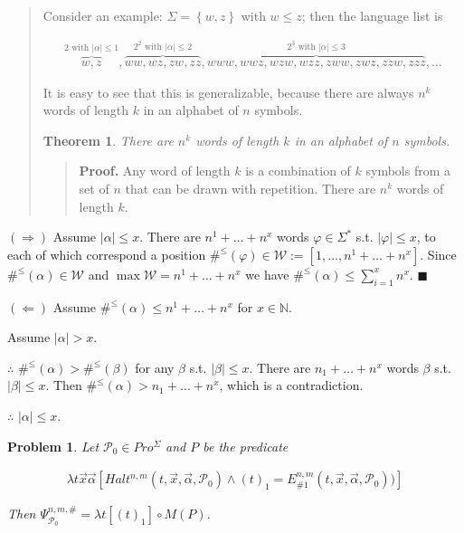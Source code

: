 \documentclass[a4paper, 12pt]{article}
\newtheorem{problem}{Problem}
\newtheorem{theorem}{Theorem}
\newtheorem{problem}{Problem}
\newtheorem{theorem}{Theorem}
\begin{document}
\small
\begin{quote}

Consider an example: $\Sigma = \left\{ w, z \right\} $ with $w \leq z$; then the
language list is 

\begin{align*}
    \overbrace{w, z}^{2 \text{ with }|\alpha| \leq 1}, \overbrace{ww, wz, zw,
        zz}^{2^2 \text{ with }|\alpha|
        \leq 2}, \overbrace{ www, wwz, wzw, wzz, zww, zwz, zzw, zzz }^{ 2^3
        \text{ with } |\alpha| \leq 3}, \ldots
\end{align*}

It is easy to see that this is generalizable, because there are always $n^k$
words of length $k$ in an alphabet of $n$ symbols. 

\begin{theorem}
    There are $n^k$ words of length $k$ in an alphabet of $n$ symbols.
\end{theorem}


\small
\begin{quote}
    \textbf{Proof.} Any word of length $k$ is a combination of $k$ symbols from
    a set of $n$ that can be drawn with repetition. There are $n^k$ words of
    length $k$.
\end{quote}
\normalsize


\end{quote}
\normalsize

$(\Rightarrow)$ Assume $|\alpha| \leq x$. There are $n^1 + \ldots + n^x$ words
$\varphi \in \Sigma^{*}$ s.t. $|\varphi| \leq x$, to each of which correspond a
position $\#^{\leq}(\varphi) \in \mathscr{W} := [1, \ldots, n^1 + \ldots +
n^x]$. Since $\#^{\leq}(\alpha) \in \mathscr{W}$ and $\max \mathscr{W} = n^1 +
\ldots + n^x$ we have $\#^{\leq}(\alpha) \leq \sum_{i=1}^{x} n^x$. $\blacksquare$

$(\Leftarrow)$ Assume $\#^{\leq}(\alpha) \leq n^1 + \ldots + n^x$ for $x \in
\mathbb{N}$. 

Assume $|\alpha| > x$.  

$\therefore $ $\#^{\leq}(\alpha) >
\#^{\leq}(\beta)$ for any $\beta$ s.t. $|\beta| \leq x$. There are $n_1 + \ldots
+ n^x$ words $\beta$ s.t. $|\beta| \leq x$. Then $\#^{\leq}(\alpha) > n_1 +
\ldots + n^x$, which is a contradiction. 

$\therefore $ $|\alpha| \leq x$.

\pagebreak 

\begin{problem}

    Let $\mathcal{P}_0 \in Pro^{\Sigma}$ and $P$ be the predicate

    \begin{align*}
 \lambda t\vec{x}\vec{\alpha}[Halt^{n,m}\left( t,\vec{x},\vec{\alpha}, \mathcal{P}_{0}\right) \wedge (t)_{1}=E_{\#1}^{n,m}(t,\vec{x},\vec{\alpha}, \mathcal{P}_{0}))]
\end{align*}

Then $\Psi _{\mathcal{P}_{0}}^{n,m,\#}=\lambda t\left[ (t)_{1}\right] \circ
M(P)$.
\end{problem}
\end{document}
